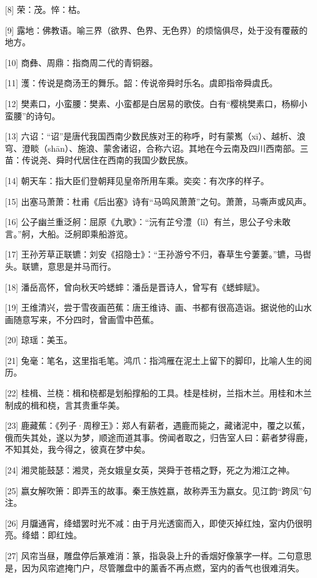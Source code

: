 \documentclass[12pt,UTF8]{ctexbook}
\begin{document}
[8] 荣：茂。悴：枯。

[9] 露地：佛教语。喻三界（欲界、色界、无色界）的烦恼俱尽，处于没有覆蔽的地方。

[10] 商彝、周鼎：指商周二代的青铜器。

[11] 濩：传说是商汤王的舞乐。韶：传说帝舜时乐名。虞即指帝舜虞氏。

[12] 樊素口，小蛮腰：樊素、小蛮都是白居易的歌伎。白有“樱桃樊素口，杨柳小蛮腰”的诗句。

[13] 六诏：“诏”是唐代我国西南少数民族对王的称呼，时有蒙嶲（xī）、越析、浪穹、澄睒（shān）、施浪、蒙舍诸诏，合称六诏。其地在今云南及四川西南部。三苗：传说尧、舜时代居住在西南的我国少数民族。

[14] 朝天车：指大臣们登朝拜见皇帝所用车乘。奕奕：有次序的样子。

[15] 出塞马萧萧：杜甫《后出塞》诗有“马鸣风萧萧”之句。萧萧，马嘶声或风声。

[16] 公子幽兰重泛舸：屈原《九歌》：“沅有芷兮澧（lǐ）有兰，思公子兮未敢言。”舸，大船。泛舸即乘船游览。

[17] 王孙芳草正联镳：刘安《招隐士》：“王孙游兮不归，春草生兮萋萋。”镳，马辔头。联镳，意思是并马而行。

[18] 潘岳高怀，曾向秋天吟蟋蟀：潘岳是晋诗人，曾写有《蟋蟀赋》。

[19] 王维清兴，尝于雪夜画芭蕉：唐王维诗、画、书都有很高造诣。据说他的山水画随意写来，不分四时，曾画雪中芭蕉。

[20] 琼瑶：美玉。

[21] 兔毫：笔名，这里指毛笔。鸿爪：指鸿雁在泥土上留下的脚印，比喻人生的阅历。

[22] 桂楫、兰桡：楫和桡都是划船撑船的工具。桂是桂树，兰指木兰。用桂和木兰制成的楫和桡，言其贵重华美。

[23] 鹿藏蕉：《列子·周穆王》：郑人有薪者，遇鹿而毙之，藏诸泥中，覆之以蕉，俄而失其处，遂以为梦，顺途而道其事。傍闻者取之，归告室人曰：薪者梦得鹿，不知其处，我今得之，彼真在梦中矣。

[24] 湘灵能鼓瑟：湘灵，尧女娥皇女英，哭舜于苍梧之野，死之为湘江之神。

[25] 嬴女解吹箫：即弄玉的故事。秦王族姓嬴，故称弄玉为嬴女。见江韵“跨凤”句注。

[26] 月牖通宵，绛蜡罢时光不减：由于月光透窗而入，即使灭掉红烛，室内仍很明亮。绛蜡：即红烛。

[27] 风帘当昼，雕盘停后篆难消：篆，指袅袅上升的香烟好像篆字一样。二句意思是，因为风帘遮掩门户，尽管雕盘中的薰香不再点燃，室内的香气也很难消失。
\end{document}
